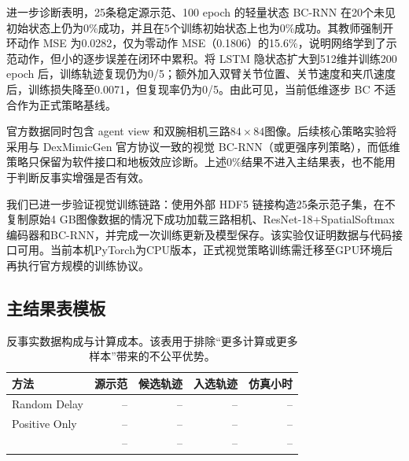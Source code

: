 进一步诊断表明，25条稳定源示范、100 epoch 的轻量状态 BC-RNN 在20个未见初始状态上仍为0\%成功，并且在5个训练初始状态上也为0\%成功。其教师强制开环动作 MSE 为0.0282，仅为零动作 MSE（0.1806）的15.6\%，说明网络学到了示范动作，但小的逐步误差在闭环中累积。将 LSTM 隐状态扩大到512维并训练200 epoch 后，训练轨迹复现仍为0/5；额外加入双臂关节位置、关节速度和夹爪速度后，训练损失降至0.0071，但复现率仍为0/5。由此可见，当前低维逐步 BC 不适合作为正式策略基线。

官方数据同时包含 agent view 和双腕相机三路$84\times84$图像。后续核心策略实验将采用与 DexMimicGen 官方协议一致的视觉 BC-RNN（或更强序列策略），而低维策略只保留为软件接口和地板效应诊断。上述0\%结果不进入主结果表，也不能用于判断反事实增强是否有效。

我们已进一步验证视觉训练链路：使用外部 HDF5 链接构造25条示范子集，在不复制原始4 GB图像数据的情况下成功加载三路相机、ResNet-18+SpatialSoftmax编码器和BC-RNN，并完成一次训练更新及模型保存。该实验仅证明数据与代码接口可用。当前本机PyTorch为CPU版本，正式视觉策略训练需迁移至GPU环境后再执行官方规模的训练协议。

\subsection{主结果表模板}

\begin{table}[t]
\centering
\caption{不同源示范数量下的策略成功率（\%）。报告均值$\pm$标准差。}
\label{tab:main}
\end{table}

\begin{table}[t]
\centering
\caption{反事实数据构成与计算成本。该表用于排除“更多计算或更多样本”带来的不公平优势。}
\label{tab:data_budget}
\begin{tabular}{lrrrr}
\toprule
方法 & 源示范 & 候选轨迹 & 入选轨迹 & 仿真小时 \\
\midrule
Random Delay & -- & -- & -- & -- \\
Positive Only & -- & -- & -- & -- \\
\method{} & -- & -- & -- & -- \\
\bottomrule
\end{tabular}
\end{table}

